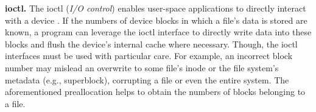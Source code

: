 \textbf{ioctl.} The ioctl ({\em I/O control}) enables  user-space applications
to directly interact with a device \cite{ioctlWik84:online}. If the numbers of device blocks
in which a file's data is stored are known, 
a program can leverage the ioctl interface to directly write data into these blocks
and   flush the device's internal cache where necessary\cite{6702624}.
Though, the ioctl interfaces must be used with particular care. For example, 
an incorrect block number may mislead an overwrite to 
some file's inode or the
file system's metadata (e.g., superblock), corrupting 
a file or even the entire system.
The aforementioned preallocation helps to obtain the numbers of   
blocks  belonging to a file.

